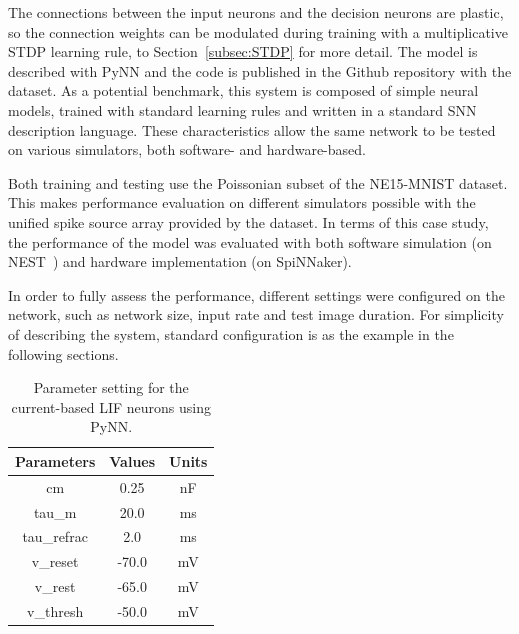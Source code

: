 The connections between the input neurons and the decision neurons are plastic, so the connection weights can be modulated during training with a multiplicative STDP learning rule, \DIFdelbegin {}\DIFdelend \DIFaddbegin {}\DIFaddend to Section~\ref{subsec:STDP} for more detail.
The model is described with PyNN and the code is published in
the Github repository with the dataset.
As a potential benchmark, this system is composed of simple neural models, trained with standard learning rules and written in a standard SNN description language. These characteristics allow the same network to be tested on various simulators, both software- and hardware-based.

Both training and testing use the Poissonian subset of the NE15-MNIST dataset.
This makes performance evaluation on different simulators possible with the unified spike source array provided by the dataset. 
In terms of this case study, the performance of the model was evaluated with both software simulation (on NEST~\citep{gewaltig2007nest}) and \DIFaddbegin {}\DIFaddend hardware implementation (on SpiNNaker).

In order to fully assess the performance, different settings were configured on the network, such as network size, input rate and test image duration.
For simplicity of describing the system, \DIFdelbegin {}\DIFdelend \DIFaddbegin {}\DIFaddend standard configuration is \DIFdelbegin {}\DIFdelend \DIFaddbegin {}\DIFaddend as the example in the following sections.

\begin{table}[hbbp]
	\centering
	\caption{\label{tbl:pynnSetting}Parameter setting for the current-based LIF neurons using PyNN.}
	\bgroup
	\def\arraystretch{1.4}
	\begin{tabular}{c c c}
		Parameters & Values & Units \\
		\hline
		cm & 0.25 & nF	\\
		tau\_m & 20.0 & ms\\
		tau\_refrac & 2.0 & ms\\
		v\_reset & -70.0 & mV\\
		v\_rest & -65.0 & mV\\
		v\_thresh & -50.0 & mV\\
	\end{tabular}
	\egroup
\end{table}

